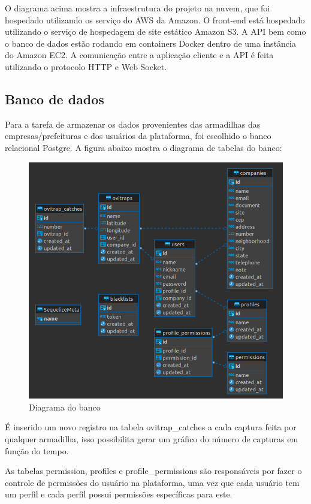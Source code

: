 \documentclass[
	12pt,				%
	openright,			%
	oneside,			%
	a4paper,			%
	chapter=TITLE,		%
	english,			%
	brazil				%
	]{abntex2}
\begin{document}
O diagrama acima mostra a infraestrutura do projeto na nuvem, que foi hospedado utilizando os serviço do AWS da Amazon. O front-end está hospedado
utilizando o serviço de hospedagem de site estático Amazon S3. A API bem como o banco de dados estão rodando em containers Docker dentro de 
uma instância do Amazon EC2. A comunicação entre a aplicação cliente e a API é feita utilizando o protocolo HTTP e Web Socket.

\subsection{Banco de dados}

Para a tarefa de armazenar os dados provenientes das armadilhas das empresas/prefeituras e dos usuários da plataforma, 
foi escolhido o banco relacional Postgre. A figura abaixo mostra o diagrama de tabelas do banco:

\begin{figure}[H]
\centering
\includegraphics[scale=0.5]{imagens/EsquemaBanco.png}
\caption{Diagrama do banco}
    \label{fig:banco}
\end{figure}

É inserido um novo registro na tabela ovitrap\_catches a cada captura feita por qualquer armadilha, isso possibilita gerar um gráfico do 
número de capturas em função do tempo.

As tabelas permission, profiles e profile\_permissions são responsáveis por fazer o controle de permissões do usuário na plataforma, 
uma vez que cada usuário tem um perfil e cada perfil possui permissões específicas para este. 
\end{document}
